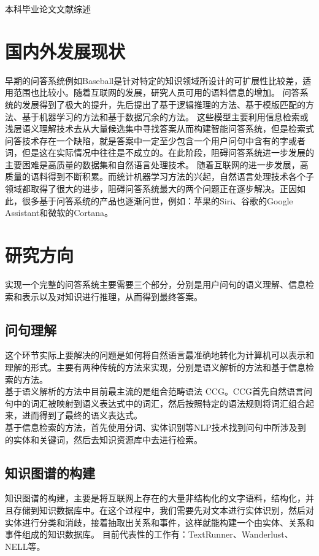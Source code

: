 {\sanhao\heiti\filcenter \centerline{本科毕业论文文献综述}}
\section{国内外发展现状}
早期的问答系统例如Baseball\cite{green1961baseball}是针对特定的知识领域所设计的可扩展性比较差，适用范围也比较小。随着互联网的发展，研究人员可用的语料信息的增加。
问答系统的发展得到了极大的提升，先后提出了基于逻辑推理的方法\cite{moldovan2001logic}、基于模版匹配的方法\cite{soubbotin2001patterns}、基于机器学习的方法\cite{yang2002integration}和基于数据冗余的方法\cite{kwok2001scaling}。
这些模型主要利用信息检索或浅层语义理解技术去从大量候选集中寻找答案从而构建智能问答系统，但是检索式问答技术存在一个缺陷，就是答案中一定至少包含一个用户问句中含有的字或者词，但是这在实际情况中往往是不成立的。在此阶段，阻碍问答系统进一步发展的主要困难是高质量的数据集和自然语言处理技术。
随着互联网的进一步发展，高质量的语料得到不断积累。而统计机器学习方法的兴起，自然语言处理技术各个子领域都取得了很大的进步，阻碍问答系统最大的两个问题正在逐步解决。正因如此，很多基于问答系统的产品也逐渐问世，例如：苹果的Siri、谷歌的Google Assistant和微软的Cortana。
\section{研究方向}
实现一个完整的问答系统主要需要三个部分，分别是用户问句的语义理解、信息检索和表示以及对知识进行推理，从而得到最终答案。
\subsection{问句理解}
这个环节实际上要解决的问题是如何将自然语言最准确地转化为计算机可以表示和理解的形式。主要有两种传统的方法来实现，分别是语义解析的方法和基于信息检索的方法。\\
基于语义解析的方法中目前最主流的是组合范畴语法 CCG\cite{kwiatkowski2011lexical}\cite{zettlemoyer2012learning}。CCG首先自然语言问句中的词汇被映射到语义表达式中的词汇，然后按照特定的语法规则将词汇组合起来，进而得到了最终的语义表达式。\\
基于信息检索的方法，首先使用分词、实体识别等NLP技术找到问句中所涉及到的实体和关键词，然后去知识资源库中去进行检索。
\subsection{知识图谱的构建}
知识图谱的构建，主要是将互联网上存在的大量非结构化的文字语料，结构化，并且存储到知识数据库中。在这个过程中，我们需要先对文本进行实体识别，然后对实体进行分类和消歧，接着抽取出关系和事件，这样就能构建一个由实体、关系和事件组成的知识数据库。
目前代表性的工作有：TextRunner\cite{yates2007textrunner}、Wanderlust\cite{akbik2009wanderlust}、NELL\cite{kwiatkowski2011lexical}等。
